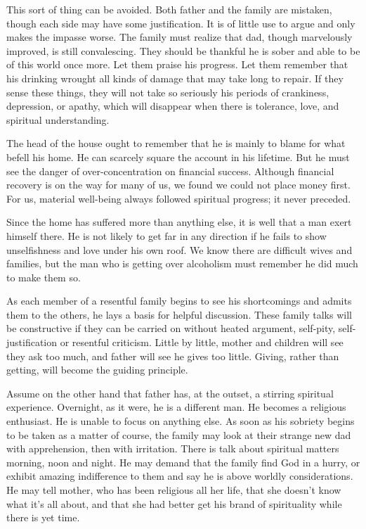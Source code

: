 \begin{biblechapter}
This sort of thing can be avoided.  Both father and the family are mistaken, though each side may have some justification.  It is of little use to argue and only makes the impasse worse.  The family must realize that dad, though marvelously improved, is still convalescing.  They should be thankful he is sober and able to be of this world once more.  Let them praise his progress.  Let them remember that his drinking wrought all kinds of damage that may take long to repair.  If they sense these things, they will not take so seriously his periods of crankiness, depression, or apathy, which will disappear when there is tolerance, love, and spiritual understanding.

The head of the house ought to remember that he is mainly to blame for what befell his home.  He can scarcely square the account in his lifetime.  But he must see the danger of over-concentration on financial success.  Although financial recovery is on the way for many of us, we found we could not place money first.  For us, material well-being always followed spiritual progress; it never preceded.

Since the home has suffered more than anything else, it is well that a man exert himself there.  He is not likely to get far in any direction if he fails to show unselfishness and love under his own roof.  We know there are difficult wives and families, but the man who is getting over alcoholism must remember he did much to make them so.

As each member of a resentful family begins to see his shortcomings and admits them to the others, he lays a basis for helpful discussion.  These family talks will be constructive if they can be carried on without heated argument, self-pity, self-justification or resentful criticism.  Little by little, mother and children will see they ask too much, and father will see he gives too little.  Giving, rather than getting, will become the guiding principle.

Assume on the other hand that father has, at the outset, a stirring spiritual experience.  Overnight, as it were, he is a different man.  He becomes a religious enthusiast.  He is unable to focus on anything else.  As soon as his sobriety begins to be taken as a matter of course, the family may look at their strange new dad with apprehension, then with irritation.  There is talk about spiritual matters morning, noon and night.  He may demand that the family find God in a hurry, or exhibit amazing indifference to them and say he is above worldly considerations.  He may tell mother, who has been religious all her life, that she doesn't know what it's all about, and that she had better get his brand of spirituality while there is yet time.


\end{biblechapter}
